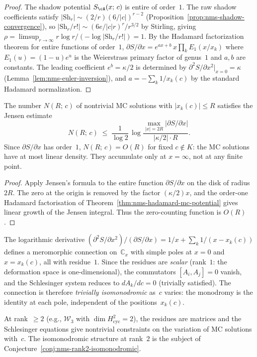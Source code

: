 \begin{proof}
The shadow potential $S_{\cA}(x;\,c)$ is entire of order~$1$.
The raw shadow coefficients satisfy
$|\mathrm{Sh}_r| \sim (2/r)(6/|c|)^{r-2}$
(Proposition~\ref{prop:nms-shadow-convergence}),
so $|\mathrm{Sh}_r/r!| \sim (6e/|c|r)^r / r^{3/2}$ by Stirling,
giving
$\rho = \limsup_{r \to \infty}
r \log r / (-\log |\mathrm{Sh}_r/r!|) = 1$.
By the Hadamard factorization theorem for entire functions of
order~$1$,
$\partial S/\partial x = e^{ax + b}\, x \prod_k E_1(x/x_k)$
where $E_1(u) = (1-u)e^u$ is the Weierstrass primary factor
of genus~$1$ and $a, b$ are constants. The leading coefficient
$e^b = \kappa/2$ is determined by
$\partial^2 S/\partial x^2|_{x=0} = \kappa$
(Lemma~\ref{lem:nms-euler-inversion}), and
$a = -\sum_k 1/x_k(c)$ by the standard Hadamard normalization.
\end{proof}

\begin{corollary}
\label{cor:nms-mc-solution-counting}%
%
\ClaimStatusConditional
The number $N(R;\,c)$ of nontrivial MC solutions with
$|x_k(c)| \leq R$ satisfies the Jensen estimate
\[
N(R;\,c)
\;\leq\;
\frac{1}{\log 2}\,
\log \frac{\max_{|x|=2R} |\partial S/\partial x|}{|\kappa/2| \cdot R}.
\]
Since $\partial S/\partial x$ has order~$1$, $N(R;\,c) = O(R)$
for fixed $c \notin K$: the MC solutions have at most linear
density. They accumulate only at $x = \infty$, not at any
finite point.
\end{corollary}

\begin{proof}
Apply Jensen's formula to the entire function
$\partial S/\partial x$ on the disk of radius $2R$. The zero at the
origin is removed by the factor $(\kappa/2)x$, and the order-one
Hadamard factorisation of Theorem~\ref{thm:nms-hadamard-mc-potential}
gives linear growth of the Jensen integral. Thus the zero-counting
function is $O(R)$.
\end{proof}

\begin{remark}
\label{rem:nms-trivial-isomonodromy}%
%
The logarithmic derivative
$(\partial^2 S/\partial x^2)/(\partial S/\partial x)
= 1/x + \sum_k 1/(x - x_k(c))$ defines a meromorphic connection
on~$\mathbb{C}_x$ with simple poles at $x = 0$ and $x = x_k(c)$, all with
residue~$1$. Since the residues are \emph{scalar} (rank~$1$: the
deformation space is one-dimensional), the commutators
$[A_i, A_j] = 0$ vanish, and the Schlesinger system
reduces to $dA_k/dc = 0$ (trivially satisfied).
The connection is therefore \emph{trivially isomonodromic} as~$c$
varies: the monodromy is the identity at each pole, independent
of the positions~$x_k(c)$.

At rank~$\geq 2$ (e.g., $\mathcal{W}_3$ with
$\dim H^2_{\mathrm{cyc}} = 2$), the residues are matrices and the
Schlesinger equations give nontrivial constraints on the variation of
MC solutions with~$c$. The isomonodromic structure at rank~$2$ is
the subject of Conjecture~\ref{conj:nms-rank2-isomonodromic}.
\end{remark}


